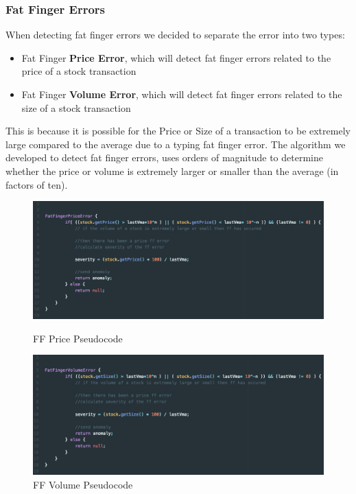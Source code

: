 \documentclass[12pt]{article}
\begin{document}
    \subsubsection{Fat Finger Errors}
    When detecting fat finger errors we decided to separate the error into two types:
    \begin{itemize}
      \itemsep0em
      \item Fat Finger \textbf{Price Error}, which will detect fat finger errors related to the price of a stock transaction
      \item Fat Finger \textbf{Volume Error}, which will detect fat finger errors related to the size of a stock transaction
    \end{itemize}
    This is because it is possible for the Price or Size of a transaction to be extremely large compared to the average due to a typing fat finger error.
    The algorithm we developed to detect fat finger errors, uses orders of magnitude to determine whether the price or volume is extremely larger or smaller than the average (in factors of ten).
    \begin{figure}[H]
      \centering
      \begin{minipage}{0.4\textwidth}
        \includegraphics[width=\textwidth]{FFprice.png}
        \caption{FF Price Pseudocode}
      \end{minipage}
      \begin{minipage}{0.4\textwidth}
        \includegraphics[width=\textwidth]{FFvolume.png}
        \caption{FF Volume Pseudocode}
      \end{minipage}
    \end{figure}
\end{document}
